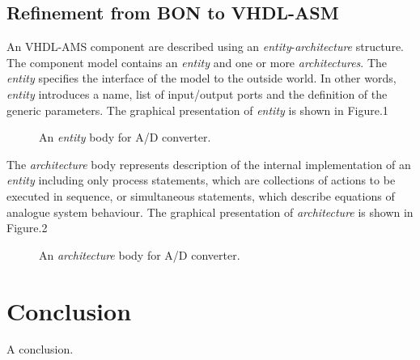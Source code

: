 \documentclass{article}
\newcommand{\ent}{\emph{entity}\xspace}
\newcommand{\arch}{\emph{architecture}\xspace}
\newcommand{\archs}{\emph{architectures}\xspace}
\begin{document}
\subsection{Refinement from BON to VHDL-ASM}

An VHDL-AMS component are described using an \ent-\arch structure. 
The component model contains an \ent and one or more \archs. 
The \ent specifies the interface of the model to the outside world. 
In other words, \ent introduces a name, list of input/output ports 
and the definition of the generic parameters. The graphical 
presentation of \ent is shown in Figure.1 

\begin{figure}[htp]
\centering

\caption{An \ent body for A/D converter.}
\label{figure:adc-entity}
\end{figure}

The \arch body represents description of the internal implementation 
of an \ent including only process statements, which are collections 
of actions to be executed in sequence, or simultaneous statements, 
which describe equations of analogue system behaviour. 
The graphical presentation of \arch is shown in Figure.2
\begin{figure}[htp]
\centering

\caption{An \arch body for A/D converter.}
\label{figure:adc-entity}
\end{figure} 



\section{Conclusion}

A conclusion.




\end{document}
